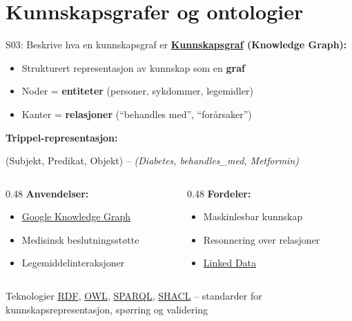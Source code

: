 \documentclass[aspectratio=169, 10pt]{beamer}
\begin{document}
\section{Kunnskapsgrafer og ontologier}

\begin{frame}{S03: Beskrive hva en kunnskapsgraf er}
    \textbf{\href{https://en.wikipedia.org/wiki/Knowledge_graph}{Kunnskapsgraf} (Knowledge Graph):}
    \begin{itemize}
        \item Strukturert representasjon av kunnskap som en \textbf{graf}
        \item Noder = \textbf{entiteter} (personer, sykdommer, legemidler)
        \item Kanter = \textbf{relasjoner} (``behandles med'', ``forårsaker'')
    \end{itemize}
    
    \vspace{0.1cm}
    \textbf{Trippel-representasjon:}
    \begin{center}
        (Subjekt, Predikat, Objekt) -- \textit{(Diabetes, behandles\_med, Metformin)}
    \end{center}
    
    \vspace{0.1cm}
    \begin{columns}[T]
        \begin{column}{0.48\textwidth}
            \textbf{Anvendelser:}
            \begin{itemize}
                \item \href{https://en.wikipedia.org/wiki/Google_Knowledge_Graph}{Google Knowledge Graph}
                \item Medisinsk beslutningsstøtte
                \item Legemiddelinteraksjoner
            \end{itemize}
        \end{column}
        \begin{column}{0.48\textwidth}
            \textbf{Fordeler:}
            \begin{itemize}
                \item Maskinlesbar kunnskap
                \item Resonnering over relasjoner
                \item \href{https://en.wikipedia.org/wiki/Linked_data}{Linked Data}
            \end{itemize}
        \end{column}
    \end{columns}
    
    \vspace{0.05cm}
    {\scriptsize
    \begin{block}{Teknologier}
        \href{https://en.wikipedia.org/wiki/Resource_Description_Framework}{RDF}, \href{https://en.wikipedia.org/wiki/Web_Ontology_Language}{OWL}, \href{https://en.wikipedia.org/wiki/SPARQL}{SPARQL}, \href{https://en.wikipedia.org/wiki/SHACL}{SHACL} -- standarder for kunnskapsrepresentasjon, spørring og validering
    \end{block}
    }
\end{frame}
\end{document}
